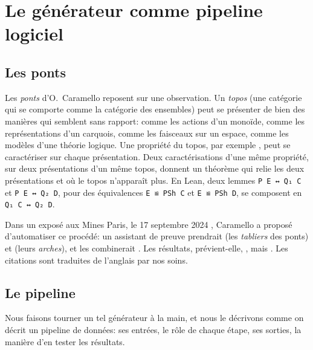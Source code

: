 \section{Le générateur comme pipeline logiciel}\label{sec:intro}

\subsection{Les ponts}

Les \emph{ponts} d'O.~Caramello \cite{caramello-unification,caramello-tst} reposent sur une observation. Un \emph{topos} (une catégorie qui se comporte comme la catégorie des ensembles) peut se présenter de bien des manières qui semblent sans rapport: comme les actions d'un monoïde, comme les représentations d'un carquois, comme les faisceaux sur un espace, comme les modèles d'une théorie logique. Une propriété du topos, par exemple , peut se caractériser sur chaque présentation. Deux caractérisations d'une même propriété, sur deux présentations d'un même topos, donnent un théorème qui relie les deux présentations et où le topos n'apparaît plus. En Lean, deux lemmes \texttt{P E ↔ Q₁ C} et \texttt{P E ↔ Q₂ D}, pour des équivalences \texttt{E ≌ PSh C} et \texttt{E ≌ PSh D}, se composent en \texttt{Q₁ C ↔ Q₂ D}.

Dans un exposé aux Mines Paris, le 17 septembre 2024 \cite{caramello-mines}, Caramello a proposé d'automatiser ce procédé: un assistant de preuve prendrait  (les \emph{tabliers} des ponts) et  (leurs \emph{arches}), et les combinerait  \cite[transparent 11]{caramello-mines}. Les résultats, prévient-elle, , mais  \cite[transparent 8]{caramello-mines}. Les citations sont traduites de l'anglais par nos soins.

\subsection{Le pipeline}

Nous faisons tourner un tel générateur à la main, et nous le décrivons comme on décrit un pipeline de données: ses entrées, le rôle de chaque étape, ses sorties, la manière d'en tester les résultats.


